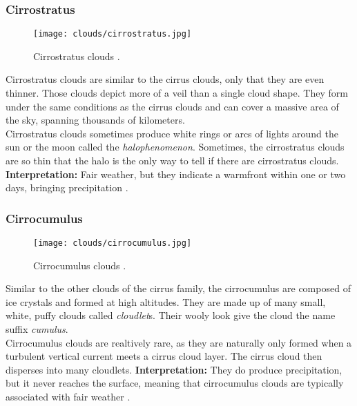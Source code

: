 \subsubsection{Cirrostratus}
\begin{wrapfigure}[10]{r}{6.3cm}
    \vspace{-\baselineskip}
    \texttt{[image: clouds/cirrostratus.jpg]}
    \caption{Cirrostratus clouds \protect\cite{cloudtypes:wiki:cirrostratus}.}
    \label{img:clouds:cirrostratus}
\end{wrapfigure}
Cirrostratus clouds are similar to the cirrus clouds, only that they are even thinner.
Those clouds depict more of a veil than a single cloud shape.
They form under the same conditions as the cirrus clouds and can cover a massive area of the sky, spanning thousands of kilometers.
\\
\noindent
Cirrostratus clouds sometimes produce white rings or arcs of lights around the sun or the moon called the \emph{\gls{halophenomenon}}.
Sometimes, the cirrostratus clouds are so thin that the halo is the only way to tell if there are cirrostratus clouds.
\emptyline
\textbf{Interpretation:} Fair weather, but they indicate a \gls{warmfront} within one or two days, bringing \gls{precipitation} \cite{cloudtypes:meteoblue}.

\subsubsection{Cirrocumulus}
\begin{wrapfigure}[10]{r}{6.3cm}
    \vspace{-\baselineskip}
    \texttt{[image: clouds/cirrocumulus.jpg]}
    \caption{Cirrocumulus clouds \protect\cite{cloudtypes:wiki:cirrocumulus}.}
    \label{img:clouds:cirrocumulus}
\end{wrapfigure}
Similar to the other clouds of the cirrus family, the cirrocumulus are composed of ice crystals and formed at high \gls{altitude}s.
They are made up of many small, white, puffy clouds called \emph{\gls{cloudlet}}s. Their wooly look give the cloud the name suffix \emph{cumulus}.
\\
\noindent
Cirrocumulus clouds are realtively rare, as they are naturally only formed when a turbulent vertical current meets a cirrus cloud layer. The cirrus cloud then disperses into many \gls{cloudlet}s.
\emptyline
\textbf{Interpretation:} 
They do produce \gls{precipitation}, but it never reaches the surface, meaning that cirrocumulus clouds are typically associated with fair weather \cite{cloudtypes:meteoblue}.

